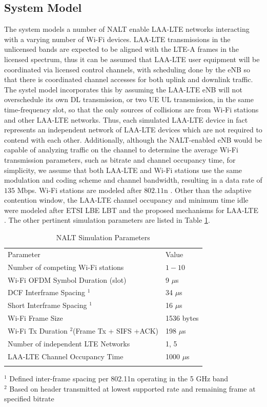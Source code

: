 \subsection{System Model}
\label{sys-model}
The system models a number of NALT enable LAA-LTE networks interacting with a varying number of Wi-Fi devices.  LAA-LTE transmissions in the unlicensed bands are expected to be aligned with the LTE-A frames in the licensed spectrum, thus it can be assumed that \mbox{LAA-LTE} user equipment will be coordinated via licensed control channels, with scheduling done by the eNB so that there is coordinated channel accesses for both uplink and downlink traffic.  The systel model incorporates this by assuming the LAA-LTE eNB will not overschedule its own DL transmission, or two UE UL transmission, in the same time-frequency slot, so that the only sources of collisions are from Wi-Fi stations and other LAA-LTE networks. Thus, each simulated LAA-LTE device in fact represents an independent network of LAA-LTE devices which are not required to contend with each other. Additionally, although the NALT-enabled eNB would be capable of analyzing traffic on the channel to determine the average Wi-Fi transmission parameters, such as bitrate and channel occupancy time, for simplicity, we assume that both \mbox{LAA-LTE} and \mbox{Wi-Fi} stations use the same modulation and coding scheme and channel bandwidth, resulting in a data rate of $135$ Mbps.  Wi-Fi stations are modeled after $802.11$n \cite{80211}.  Other than the adaptive contention window, the LAA-LTE channel occupancy and minimum time idle were modeled after ETSI LBE LBT and the proposed mechanisms for \mbox{LAA-LTE} \cite{3gpp}.  The other pertinent simulation parameters are listed in Table \ref{params}.
\begin{table}
	\caption{NALT Simulation Parameters}
	\label{params}      
	\begin{tabular}{p{7cm}p{5cm}}
		\hline\noalign{\smallskip}
		Parameter & Value \\
		\noalign{\smallskip}\svhline\noalign{\smallskip}
		Number of competing \mbox{Wi-Fi} stations& $1 - 10$ \\ 
		Wi-Fi OFDM Symbol Duration (slot) & 9 $\mu$s    \\ 
		DCF Interframe Spacing $^1$ & 34 $\mu$s   \\ 
		Short Interframe Spacing $^1$ & 16 $\mu$s   \\ 
		\mbox{Wi-Fi} Frame Size & 1536 bytes  \\ 
		\mbox{Wi-Fi} Tx Duration $^2$(Frame Tx + SIFS +ACK) & 198 $\mu$s   \\ 
		Number of independent LTE Networks & 1, 5 \\
		\mbox{LAA-LTE} Channel Occupancy Time  & 1000 $\mu$s \\ 	
		\noalign{\smallskip}\hline\noalign{\smallskip}
	\end{tabular}
	$^1$ Defined inter-frame spacing per 802.11n operating in the 5 GHz band \\
	$^2$ Based on header transmitted at lowest supported rate and remaining frame at specified bitrate	 
\end{table}

